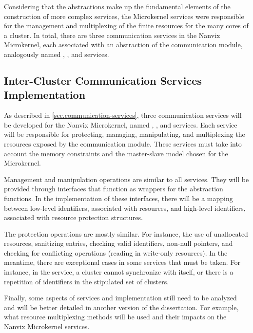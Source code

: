 			Considering that the abstractions make up the fundamental elements of
			the construction of more complex services, the Microkernel services
			were responsible for the management and multiplexing of the finite
			resources for the many cores of a cluster.
			In total, there are three communication services in the Nanvix Microkernel,
			each associated with an abstraction of the communication module,
			analogously named \sync, \mailbox, and \portal services.

		\subsection*{Inter-Cluster Communication Services Implementation}


			As described in \autoref{sec.communication-services}, three communication
			services will be developed for the Nanvix Microkernel, named \sync, \mailbox,
			and \portal services.
			Each service will be responsible for protecting, managing, manipulating,
			and multiplexing the resources exposed by the \hal communication module.
			These services must take into account the memory constraints and the
			master-slave model chosen for the Microkernel.

			Management and manipulation operations are similar to all services.
			They will be provided through interfaces that function as wrappers
			for the \hal abstraction functions.
			In the implementation of these interfaces, there will be a mapping
			between low-level identifiers, associated with \hal resources,
			and high-level identifiers, associated with resource protection structures.


			The protection operations are mostly similar.
			For instance, the use of unallocated resources, sanitizing entries,
			checking valid identifiers, non-null pointers, and checking
			for conflicting operations (reading in write-only resources).
			In the meantime, there are exceptional cases in some services
			that must be taken.
			For instance, in the \sync service, a cluster cannot synchronize
			with itself, or there is a repetition of identifiers in the
			stipulated set of clusters.

			Finally, some aspects of services and implementation still need
			to be analyzed and will be better detailed in another version
			of the dissertation.
			For example, what resource multiplexing methods will be used
			and their impacts on the Nanvix Microkernel services.